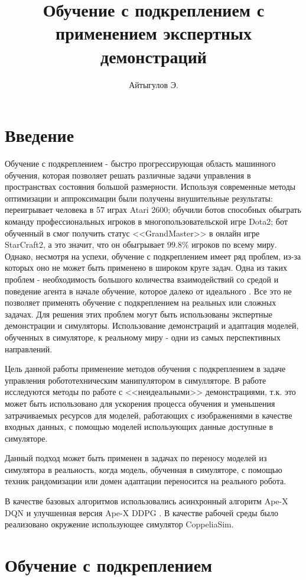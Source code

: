 \documentclass{mipt-thesis-bs}
\title{Обучение с подкреплением с применением экспертных демонстраций}
\author{Айтыгулов Э.}
\begin{document}
\frontmatter
\titlecontents

\chapter{Введение}
Обучение с подкреплением - быстро прогрессирующая область машинного обучения, которая позволяет решать различные задачи управления в пространствах состояния большой размерности. Используя современные методы оптимизации и аппроксимации были получены внушительные результаты: \cite{Agent-57} переигрывает человека в 57 играх Atari 2600; \cite{OpenAI}  обучили ботов способных обыграть команду профессиональных игроков в многопользовательской игре Dota2; бот обученный в \cite{DeepMind} смог получить статус <<GrandMaster>> в онлайн игре StarCraft2, а это значит, что он обыгрывает $99.8\%$ игроков по всему миру. Однако, несмотря на успехи, обучение с подкреплением имеет ряд проблем, из-за которых оно не может быть применено в широком круге задач. Одна из таких проблем - необходимость большого количества взаимодействий со средой и поведение агента в начале обучение, которое далеко от идеального . Все это не позволяет применять обучение с подкреплением на реальных или сложных задачах. Для решения этих проблем могут быть использованы экспертные демонстрации и симуляторы. Использование демонстраций и адаптация моделей, обученных в симуляторе, к реальному миру - одни из самых перспективных направлений.

Цель данной работы применение методов обучения с подкреплением в задаче управления робототехническим манипулятором в симулляторе. В работе исследуются методы по работе с <<неидеальными>> демонстрациями, т.к. это может быть использовано для ускорения процесса обучения и уменьшения затрачиваемых ресурсов для моделей, работающих с изображениями в качестве входных данных, с помощью моделей использующих данные доступные в симуляторе. 

Данный подход может быть применен в задачах по переносу моделей из симулятора в реальность, когда модель, обученная в симуляторе, с помощью техник рандомизации или домен адаптации переносится на реального робота.

В качестве базовых алгоритмов использовались асинхронный алгоритм Ape-X DQN и улучшенная версия Ape-X DDPG  \cite{apex}. В качестве рабочей среды было реализовано окружение использующее симулятор CoppeliaSim.

\mainmatter
\chapter{Обучение с подкреплением}
\end{document}
